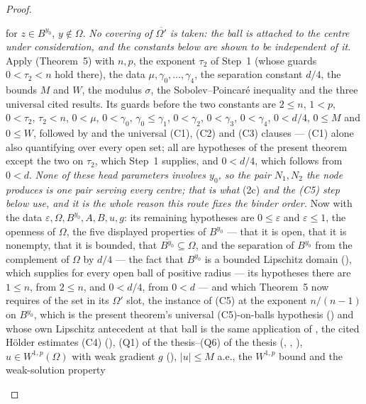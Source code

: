 \begin{proof}
\begin{enumerate}
  for $z\in B^{y_0}$, $y\notin\Omega$.  \emph{No covering of
  $\overline{\Omega'}$ is taken: the ball is attached to the centre under
  consideration, and the constants below are shown to be independent of it.}
  Apply  (Theorem~5) with $n,p$, the exponent
  $\tau_2$ of Step~1 (whose guards $0<\tau_2<n$ hold there), the data
  $\mu,\gamma_0,\dots,\gamma_4$, the separation constant $d/4$, the bounds $M$
  and $W$, the modulus $\sigma$, the Sobolev--Poincar\'e inequality and the
  three universal cited results.  Its guards before the two constants are
  $2\le n$, $1<p$, $0<\tau_2$, $\tau_2<n$, $0<\mu$, $0<\gamma_0$,
  $\gamma_0\le\gamma_1$, $0<\gamma_2$, $0<\gamma_3$, $0<\gamma_4$, $0<d/4$,
  $0\le M$ and $0\le W$, followed by  and the
  universal (C1), (C2) and (C3) clauses --- (C1) alone also quantifying over
  every open set; all are hypotheses of the present theorem except the two on
  $\tau_2$, which Step~1 supplies, and $0<d/4$, which follows from $0<d$.
  \emph{None of these head parameters involves $y_0$, so the pair $N_1,N_2$ the
  node produces is one pair serving every centre; that is what} (2c)
  \emph{and the \textup{(C5)} step below use, and it is the whole reason this
  route fixes the binder order.}
  Now with the data
  $\varepsilon,\Omega,B^{y_0},A,B,u,g$: its remaining hypotheses are
  $0\le\varepsilon$ and $\varepsilon\le1$, the openness of
  $\Omega$, the five displayed properties of $B^{y_0}$ --- that it is open, that it
  is nonempty, that it is bounded, that $\overline{B^{y_0}}\subseteq\Omega$, and
  the separation of $B^{y_0}$ from the complement of $\Omega$ by $d/4$ --- the fact that $B^{y_0}$ is a bounded Lipschitz domain
  (), which 
  supplies for every open ball of positive radius --- its hypotheses there are
  $1\le n$, from $2\le n$, and $0<d/4$, from $0<d$ --- and which Theorem~5 now
  requires of the set in its $\Omega'$ slot, the instance
  of (C5) at the
  exponent $n/(n-1)$ on $B^{y_0}$, which is the present theorem's universal
  (C5)-on-balls hypothesis () and whose own
  Lipschitz antecedent at that ball is the same application of
  , the cited
  H\"older estimates (C4) (),
  (Q1) of the thesis--(Q6) of the thesis (,
  , ),
  $u\in W^{1,p}(\Omega)$ with weak gradient $g$ (),
  $|u|\le M$ a.e., the $W^{1,p}$ bound and the weak-solution property

\end{enumerate}
\end{proof}
